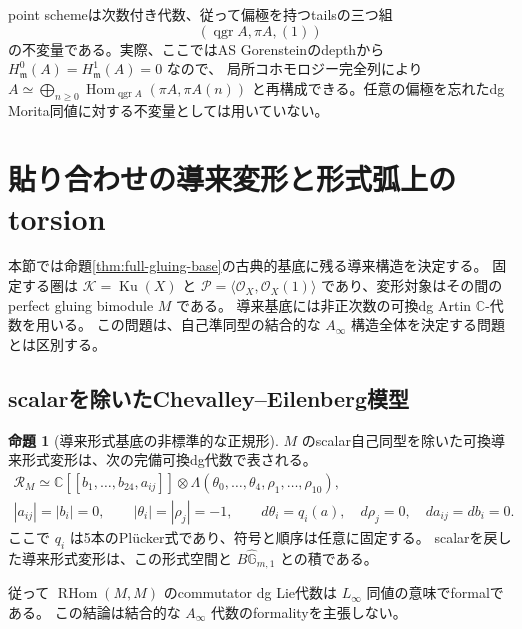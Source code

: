 \documentclass[a4paper,11pt]{ltjsarticle}
\newcommand{\mathscr}{\mathcal}
\theoremstyle{definition}
\newtheorem{theorem}{命題}[section]
\newcommand{\CC}{\mathbb C}
\newcommand{\OO}{\mathcal O}
\newcommand{\Ku}{\operatorname{Ku}}
\newcommand{\qgr}{\operatorname{qgr}}
\newcommand{\RHom}{\operatorname{RHom}}
\begin{document}
point schemeは次数付き代数、従って偏極を持つtailsの三つ組
\[
 (\qgr A,\pi A,(1))
\]
の不変量である。実際、ここではAS Gorensteinのdepthから
$H^0_{\mathfrak m}(A)=H^1_{\mathfrak m}(A)=0$ なので、
局所コホモロジー完全列により
$A\simeq\bigoplus_{n\ge0}\operatorname{Hom}_{\qgr A}(\pi A,\pi A(n))$
と再構成できる。任意の偏極を忘れたdg Morita同値に対する不変量としては用いていない。

\section{貼り合わせの導来変形と形式弧上のtorsion}\label{sec:derived-gluing}

本節では命題\ref{thm:full-gluing-base}の古典的基底に残る導来構造を決定する。
固定する圏は $\mathcal K=\Ku(X)$ と
$\mathcal P=\langle\OO_X,\OO_X(1)\rangle$ であり、変形対象はその間の
perfect gluing bimodule $M$ である。
導来基底には非正次数の可換dg Artin $\CC$-代数を用いる。
この問題は、自己準同型の結合的な $A_\infty$ 構造全体を決定する問題とは区別する。

\subsection{scalarを除いたChevalley--Eilenberg模型}

\begin{theorem}[導来形式基底の非標準的な正規形]\label{thm:derived-gluing-normal}
$M$ のscalar自己同型を除いた可換導来形式変形は、次の完備可換dg代数で表される。
\begin{gather}
 \mathscr R_M\simeq
 \CC[[b_1,\ldots,b_{24},a_{ij}]]
 \otimes\Lambda(\theta_0,\ldots,\theta_4,\rho_1,\ldots,\rho_{10}),
 \label{eq:derived-gluing-normal}\\
 |a_{ij}|=|b_i|=0,\qquad |\theta_i|=|\rho_j|=-1,\qquad
 d\theta_i=q_i(a),\quad d\rho_j=0,\quad da_{ij}=db_i=0.
 \nonumber
\end{gather}
ここで $q_i$ は5本のPlücker式であり、符号と順序は任意に固定する。
scalarを戻した導来形式変形は、この形式空間と
$B\widehat{\mathbb G}_{m,1}$ との積である。

従って $\RHom(M,M)$ のcommutator dg Lie代数は
$L_\infty$ 同値の意味でformalである。
この結論は結合的な $A_\infty$ 代数のformalityを主張しない。
\end{theorem}
\end{document}
